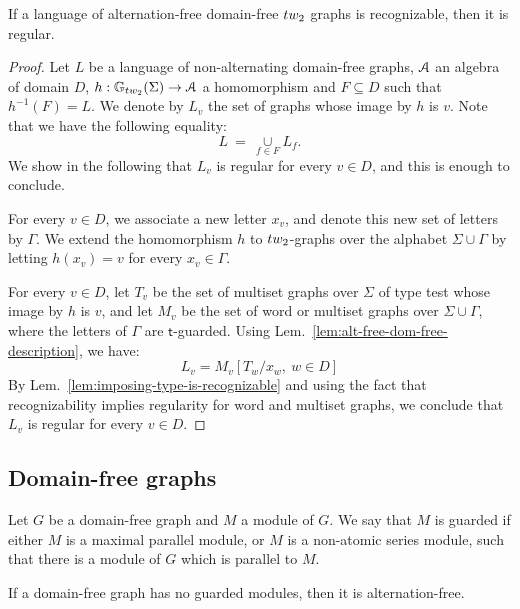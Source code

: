 \begin{proposition}\label{prop:rec->reg-alt-free-dom-free}
If a language of alternation-free domain-free $\TWT$ graphs is recognizable, then it is regular.
\end{proposition}
\begin{proof}
Let $L$ be a language of non-alternating domain-free graphs, $\mathcal A$ an algebra of domain $D$, $h:\mathbb{G}_\TWT(\Sigma) \to \A$ a homomorphism and $F\subseteq D$ such that $h^{-1}(F)=L$. We denote by $L_v$ the set of graphs whose image by $h$ is $v$. Note that we have the following equality:
 $$L\ =\ \underset{f\in F}{\cup} L_f.$$ 
We show in the following that $L_v$ is regular for every $v\in D$, and this is enough to conclude. 
\medskip

For every $v\in D$, we associate a new letter $x_v$, and denote this new set of letters by $\Gamma$.  We extend the homomorphism $h$ to $\TWT$-graphs over the alphabet $\Sigma \cup \Gamma$ by letting $h(x_v)=v$ for every $x_v\in\Gamma$. 

For every $v\in D$, let $T_{v}$ be the set of multiset graphs over $\Sigma$ of type test  whose image by $h$ is $v$, and let $M_{v}$ be the set of word or multiset graphs over  $\Sigma\cup \Gamma$, where the letters of $\Gamma$ are $\mathsf{t}$-guarded.  Using Lem.~\ref{lem:alt-free-dom-free-description}, we have:
$$ L_v=M_v[T_w/x_w,\  w\in D]$$ 
By Lem.~\ref{lem:imposing-type-is-recognizable} and using the fact that recognizability implies regularity for word and multiset graphs, we conclude that $L_v$ is regular for every $v\in D$.
\end{proof}

\subsection{Domain-free graphs}
 
\begin{definition}
Let $G$ be a domain-free graph and $M$ a module of $G$. We say that $M$ is guarded if either $M$ is a maximal parallel module, or $M$ is a non-atomic series module, such that there is a module of $G$ which is parallel to $M$.
\end{definition}

\begin{lemma}\label{lem:no-guarded-modules-imply-alt-free}
If a domain-free graph has no guarded modules, then it is alternation-free.
\end{lemma}

